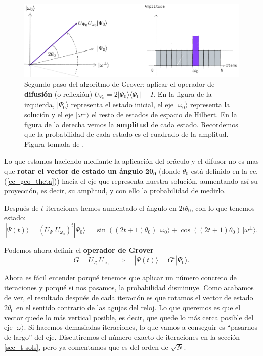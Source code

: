 \documentclass[a4paper,11pt]{book} %
\numberwithin{equation}{chapter}
\def\lp{\left(}
\def\rp{\right)}
\def\rqa{\quad \Rightarrow \quad}
\begin{document}
	\begin{figure}[t]
	\centering 
	\includegraphics[width=0.85\linewidth]{Figuras/Fig_geo_3.png}
	\caption{Segundo paso del algoritmo de Grover: aplicar el operador de \textbf{difusión} (o reflexión) $U_{\Psi_0} = 2 |\Psi_0 \rangle \langle \Psi_0 | - I$.  En la figura de la izquierda, $| \Psi_0 \rangle$ representa el estado inicial, el eje $|\omega_0 \rangle $ representa la solución y el eje $| \omega^{\perp} \rangle$ el resto de estados de espacio de Hilbert. En la figura de la 	derecha vemos la \textbf{amplitud} de cada estado. Recordemos que la probabilidad de cada estado es el cuadrado de la amplitud. Figura tomada de \cite{bib_Qiskit-Grover}.}
	\label{Fig_geo_3}
	\end{figure}


Lo que estamos haciendo mediante la aplicación del oráculo y el difusor no es mas que \textbf{rotar el vector de estado un ángulo} $\bm{2 \theta_0}$ (donde $\theta_0$ está definido en la ec. (\ref{ec_geo_theta})) hacia el eje que representa nuestra solución, aumentando así su proyección, es decir, su amplitud, y con ello la probabilidad de medirlo. 

Después de $t$ iteraciones hemos aumentado el ángulo en $2t\theta_0$, con lo que tenemos estado:
\begin{equation} \label{ec_geo_phi-j}
\boxed{|\Psi(t) \rangle = \lp U_{\Psi_0} U_{\omega_0} \rp^t | \Psi_0 \rangle} = \sin \lp (2t+1) \theta_0 \rp \, |\omega_0 \rangle + \cos \lp (2t+1) \theta_0 \rp \, | \omega^{\perp} \rangle.
\end{equation}

Podemos ahora definir el \textbf{operador de Grover}
\begin{equation}
\boxed{G = U_{\Psi_0} U_{\omega_0}} \rqa |\Psi(t) \rangle =  G^t | \Psi_0 \rangle.
\end{equation}


Ahora es fácil entender porqué tenemos que aplicar un número concreto de iteraciones y porqué si nos pasamos, la probabilidad disminuye. Como acabamos de ver, el resultado después de cada iteración es que rotamos el vector de estado $2 \theta_0$ en el sentido contrario de las agujas del reloj. Lo que queremos es que el vector quede lo más vertical posible, es decir, que quede lo más cerca posible del eje $|\omega\rangle $. Si hacemos demasiadas iteraciones, lo que vamos a conseguir es ``pasarnos de largo'' del eje. Discutiremos el número exacto de iteraciones en la sección \ref{sec_t-sols}, pero ya comentamos que es del orden de $\sqrt{N}$.
\end{document}
